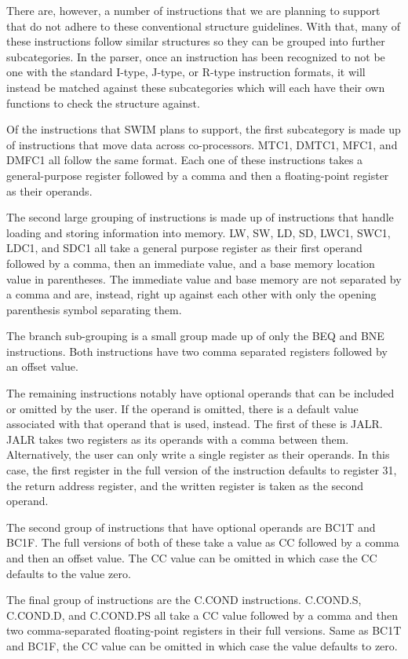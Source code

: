 \documentclass[
    parskip=half,
    fontsize=12pt,
    titlepage=firstiscover,
    toc=bibliography,
    numbers=endperiod
]{scrartcl}
\begin{document}
There are, however, a number of instructions that we are planning to
support that do not adhere to these conventional structure guidelines.
With that, many of these instructions follow similar structures so they
can be grouped into further subcategories. In the parser, once an
instruction has been recognized to not be one with the standard I-type,
J-type, or R-type instruction formats, it will instead be matched
against these subcategories which will each have their own functions to
check the structure against.

Of the instructions that SWIM plans to support, the first
subcategory is made up of instructions that move data across
co-processors. MTC1, DMTC1, MFC1, and DMFC1 all follow the same format.
Each one of these instructions takes a general-purpose register followed
by a comma and then a floating-point register as their operands.

The second large grouping of instructions is made up of instructions
that handle loading and storing information into memory. LW, SW, LD, SD,
LWC1, SWC1, LDC1, and SDC1 all take a general purpose register as their
first operand followed by a comma, then an immediate value, and a base
memory location value in parentheses. The immediate value and base
memory are not separated by a comma and are, instead, right up against
each other with only the opening parenthesis symbol separating them.

The branch sub-grouping is a small group made up of only the BEQ and BNE
instructions. Both instructions have two comma separated registers
followed by an offset value.

The remaining instructions notably have optional operands that can be
included or omitted by the user. If the operand is omitted, there is a
default value associated with that operand that is used, instead. The
first of these is JALR. JALR takes two registers as its operands with a
comma between them. Alternatively, the user can only write a single
register as their operands. In this case, the first register in the full
version of the instruction defaults to register 31, the return address
register, and the written register is taken as the second operand.

The second group of instructions that have optional operands are BC1T
and BC1F. The full versions of both of these take a value as CC followed
by a comma and then an offset value. The CC value can be omitted in
which case the CC defaults to the value zero.

The final group of instructions are the C.COND instructions. C.COND.S,
C.COND.D, and C.COND.PS all take a CC value followed by a comma and then
two comma-separated floating-point registers in their full versions.
Same as BC1T and BC1F, the CC value can be omitted in which case the
value defaults to zero.
\end{document}

